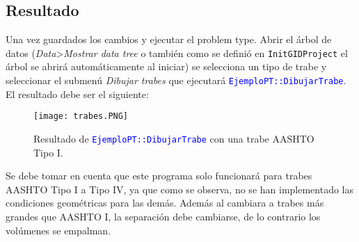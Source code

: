 \documentclass[10pt, a4paper, twocolumn]{article} %
\begin{document}
\subsection{Resultado}

Una vez guardados los cambios y ejecutar el problem type. Abrir el árbol de datos (\textit{Data}>\textit{Mostrar data tree} o también como se definió en \texttt{InitGIDProject} el árbol se abrirá automáticamente al iniciar) se selecciona un tipo de trabe y seleccionar el submenú \textit{Dibujar trabes} que ejecutará \textcolor{blue}{\texttt{EjemploPT::DibujarTrabe}}. El resultado debe ser el siguiente:

\begin{figure}[hbt!]\centering
	\texttt{[image: trabes.PNG]}
	\caption{Resultado de \textcolor{blue}{\texttt{EjemploPT::DibujarTrabe}} con una trabe AASHTO Tipo I.\label{fig:resultadotrabes}}
\end{figure}

Se debe tomar en cuenta que este programa solo funcionará para trabes AASHTO Tipo I a Tipo IV, ya que como se observa, no se han implementado las condiciones geométricas para las demás. Además al cambiara a trabes más grandes que AASHTO I, la separación debe cambiarse, de lo contrario los volúmenes se empalman.




\appendix
\end{document}
